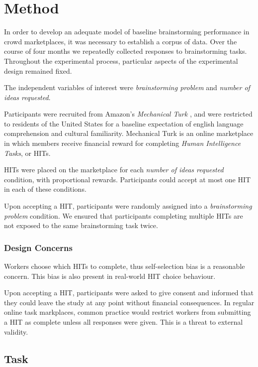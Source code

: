 \section{Method}

In order to develop an adequate model of baseline brainstorming performance in crowd marketplaces, it was necessary to establish a corpus of data. Over the course of four months we repeatedly collected responses to brainstorming tasks. Throughout the experimental process, particular aspects of the experimental design remained fixed.

The independent variables of interest were \emph{brainstorming problem} and \emph{number of ideas requested}.

Participants were recruited from Amazon's \emph{Mechanical Turk} \cite{_amazon_????}, and were restricted to residents of the United States for a baseline expectation of english language comprehension and cultural familiarity. Mechanical Turk is an online marketplace in which members receive financial reward for completing \emph{Human Intelligence Tasks}, or HITs.

HITs were placed on the marketplace for each \emph{number of ideas requested} condition, with proportional rewards. Participants could accept at most one HIT in each of these conditions.

Upon accepting a HIT, participants were randomly assigned into a \emph{brainstorming problem} condition. We ensured that participants completing multiple HITs are not exposed to the same brainstorming task twice.

\subsubsection{Design Concerns}
Workers choose which HITs to complete, thus self-selection bias is a reasonable concern. This bias is also present in real-world HIT choice behaviour. 

Upon accepting a HIT, participants were asked to give consent and informed that they could leave the study at any point without financial consequences. In regular online task markplaces, common practice would restrict workers from submitting a HIT as complete unless all responses were given. This is a threat to external validity.

\subsection{Task}

